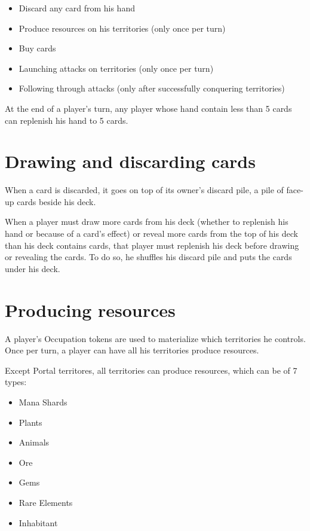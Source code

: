 \documentclass[a4paper]{article}
\begin{document}
    \begin{itemize}
        \item Discard any card from his hand
        \item Produce resources on his territories (only once per turn)
        \item Buy cards
        \item Launching attacks on territories (only once per turn)
        \item Following through attacks (only after successfully conquering territories)
    \end{itemize}

    At the end of a player's turn, any player whose hand contain less than 5 cards can replenish his hand to 5 cards.


\newpage
\section{Drawing and discarding cards}

    When a card is discarded, it goes on top of its owner's discard pile, a pile of face-up cards beside his deck.

    When a player must draw more cards from his deck (whether to replenish his hand or because of a card's effect)
    or reveal more cards from the top of his deck than his deck contains cards, that player must replenish his deck before
    drawing or revealing the cards.
    To do so, he shuffles his discard pile and puts the cards under his deck.



\section{Producing resources}

    A player's Occupation tokens are used to materialize which territories he controls.
    Once per turn, a player can have all his territories produce resources.

    Except Portal territores, all territories can produce resources, which can be of 7 types:

    \begin{itemize}
        \item Mana Shards
        \item Plants
        \item Animals
        \item Ore
        \item Gems
        \item Rare Elements
        \item Inhabitant
    \end{itemize}
\end{document}
